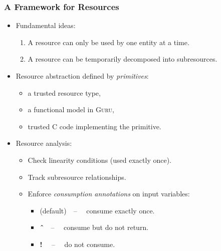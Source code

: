 \documentclass[10pt]{beamer}
\begin{document}
\begin{frame}
  \frametitle{A Framework for Resources}

\begin{itemize}

\item Fundamental ideas:

\begin{enumerate}
\item A resource can only be used by one entity at a time.
\item A resource can be temporarily decomposed into subresources.
\end{enumerate}

\item Resource abstraction defined by \emph{primitives}:

\begin{itemize}
\item a trusted resource type,
\item a functional model in \textsc{Guru},
\item trusted C code implementing the primitive.
\end{itemize}

\item Resource analysis:
\begin{itemize}
\item Check linearity conditions (used exactly once).
\item Track subresource relationships.
\item Enforce \emph{consumption annotations} on input variables:
\begin{itemize}
\item (default)\ \ -- \ \ consume exactly once.
\item \textbf{\^{\ }}\ \ -- \ \  consume but do not return.
\item \textbf{!} \ \ -- \ \  do not consume.
\end{itemize}
\end{itemize}

\end{itemize}

\end{frame}
\end{document}
